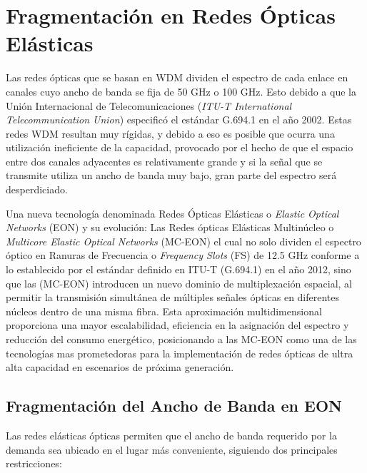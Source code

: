 \chapter{Fragmentación en Redes Ópticas Elásticas}
Las redes ópticas que se basan en WDM dividen el espectro de cada enlace en canales cuyo ancho de banda se fija de 50 GHz o 100 GHz. Esto debido a que la Unión Internacional de Telecomunicaciones (\textit{ITU-T International Telecommunication Union}) especificó el estándar G.694.1 en el año 2002.
%
Estas redes WDM resultan muy rígidas, y debido a eso es posible que ocurra una utilización ineficiente de la capacidad, provocado por el hecho de que el espacio entre dos canales adyacentes es relativamente grande y si la señal que se transmite utiliza un ancho de banda muy bajo, gran parte del espectro será desperdiciado.
%

Una nueva tecnología denominada Redes Ópticas Elásticas o \textit{Elastic Optical Networks} (EON) y su evolución: Las Redes ópticas Elásticas Multinúcleo o \textit{Multicore Elastic Optical Networks} (MC-EON) el cual no solo dividen el espectro óptico en Ranuras de Frecuencia o \textit{Frequency Slots} (FS) de 12.5 GHz conforme a lo establecido por el estándar definido en ITU-T (G.694.1) en el año 2012, sino que las (MC-EON) introducen un nuevo dominio de multiplexación espacial, al permitir la transmisión simultánea de múltiples señales ópticas en diferentes núcleos dentro de una misma fibra.
%
Esta aproximación multidimensional proporciona una mayor escalabilidad, eficiencia en la asignación del espectro y reducción del consumo energético, posicionando a las MC-EON como una de las tecnologías mas prometedoras para la implementación de redes ópticas de ultra alta capacidad en escenarios de próxima generación.




\section{Fragmentación del Ancho de Banda en EON}
Las redes elásticas ópticas permiten que el ancho de banda requerido por la demanda sea ubicado en el lugar más conveniente, siguiendo dos principales restricciones:

